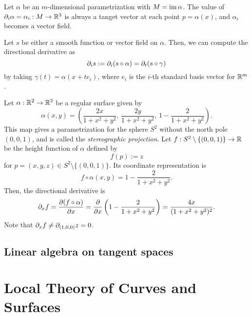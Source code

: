 \documentclass{../../large}
\def\a{\alpha}
\begin{document}
\begin{ex} %
\begin{parts}
\item
Let $\a$ be an $m$-dimensional parametrization with $M=\im\a$.
The value of $\pd_i\a=\a_i:M\to\R^3$ is always a tanget vector at each point $p=\a(x)$, and $\a_i$ becomes a vector field.

Let $s$ be either a smooth function or vector field on $\a$.
Then, we can compute the directional derivative as
\[\pd_is:=\pd_i(s\circ\a)=\pd_t(s\circ\gamma)\]
by taking $\gamma(t)=\a(x+te_i)$, where $e_i$ is the $i$-th standard basis vector for $\mathbb{R}^m$.

\item
Let $\a:\R^2\to\R^3$ be a regular surface given by
\[\a(x,y)=\left(\frac{2x}{1+x^2+y^2},\,\frac{2y}{1+x^2+y^2},\,1-\frac2{1+x^2+y^2}\right).\]
This map gives a parametrization for the sphere $S^2$ without the north pole $(0,0,1)$, and is called the \emph{stereographic projection}.
Let $f:S^2\setminus\{(0,0,1)\}\to\mathbb{R}$ be the height function of $\a$ defined by
\[f(p):=z\]
for $p=(x,y,z)\in S^2\setminus\{(0,0,1)\}$.
Its coordinate representation is
\[f\circ\a(x,y)=1-\frac2{1+x^2+y^2}.\]
Then, the directional derivative is
\[\pd_xf=\pd{(f\circ\a)}{x}=\pd{x}\left(1-\frac2{1+x^2+y^2}\right)=\frac{4x}{(1+x^2+y^2)^2}.\]
Note that $\pd_xf\ne\pd_{(1,0,0)}z=0$.
\end{parts}
\end{ex}


\section{Linear algebra on tangent spaces}






























\chapter{Local Theory of Curves and Surfaces}
\end{document}
